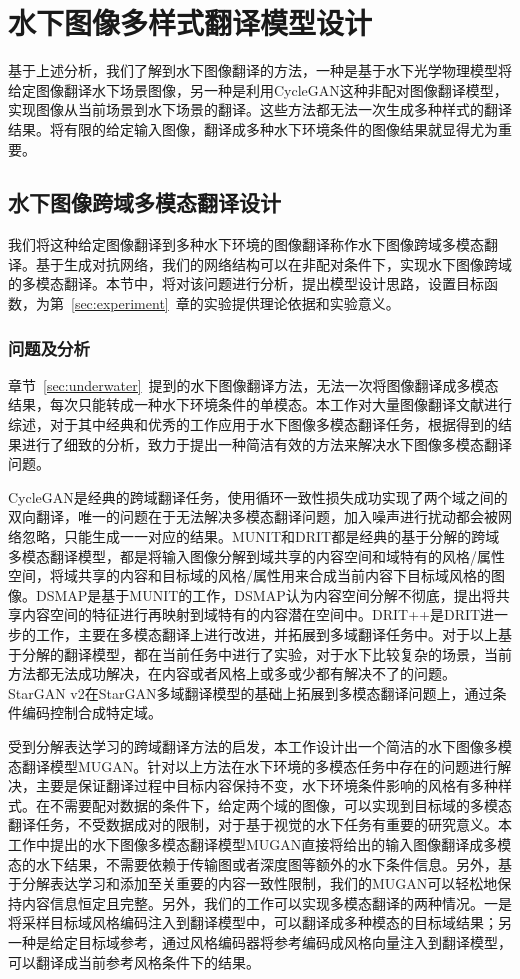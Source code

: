 \chapter{水下图像多样式翻译模型设计}
基于上述分析，我们了解到水下图像翻译的方法，一种是基于水下光学物理模型将给定图像翻译水下场景图像，另一种是利用CycleGAN这种非配对图像翻译模型，实现图像从当前场景到水下场景的翻译。这些方法都无法一次生成多种样式的翻译结果。将有限的给定输入图像，翻译成多种水下环境条件的图像结果就显得尤为重要。

\section{水下图像跨域多模态翻译设计}
我们将这种给定图像翻译到多种水下环境的图像翻译称作水下图像跨域多模态翻译。基于生成对抗网络，我们的网络结构可以在非配对条件下，实现水下图像跨域的多模态翻译。本节中，将对该问题进行分析，提出模型设计思路，设置目标函数，为第~\ref{sec:experiment}~章的实验提供理论依据和实验意义。

\subsection{问题及分析}
章节~\ref{sec:underwater}~提到的水下图像翻译方法，无法一次将图像翻译成多模态结果，每次只能转成一种水下环境条件的单模态。本工作对大量图像翻译文献进行综述，对于其中经典和优秀的工作应用于水下图像多模态翻译任务，根据得到的结果进行了细致的分析，致力于提出一种简洁有效的方法来解决水下图像多模态翻译问题。

CycleGAN是经典的跨域翻译任务，使用循环一致性损失成功实现了两个域之间的双向翻译，唯一的问题在于无法解决多模态翻译问题，加入噪声进行扰动都会被网络忽略，只能生成一一对应的结果。MUNIT和DRIT都是经典的基于分解的跨域多模态翻译模型，都是将输入图像分解到域共享的内容空间和域特有的风格/属性空间，将域共享的内容和目标域的风格/属性用来合成当前内容下目标域风格的图像。DSMAP是基于MUNIT的工作，DSMAP认为内容空间分解不彻底，提出将共享内容空间的特征进行再映射到域特有的内容潜在空间中。DRIT++是DRIT进一步的工作，主要在多模态翻译上进行改进，并拓展到多域翻译任务中。对于以上基于分解的翻译模型，都在当前任务中进行了实验，对于水下比较复杂的场景，当前方法都无法成功解决，在内容或者风格上或多或少都有解决不了的问题。StarGAN v2在StarGAN多域翻译模型的基础上拓展到多模态翻译问题上，通过条件编码控制合成特定域。

受到分解表达学习的跨域翻译方法的启发，本工作设计出一个简洁的水下图像多模态翻译模型MUGAN。针对以上方法在水下环境的多模态任务中存在的问题进行解决，主要是保证翻译过程中目标内容保持不变，水下环境条件影响的风格有多种样式。在不需要配对数据的条件下，给定两个域的图像，可以实现到目标域的多模态翻译任务，不受数据成对的限制，对于基于视觉的水下任务有重要的研究意义。本工作中提出的水下图像多模态翻译模型MUGAN直接将给出的输入图像翻译成多模态的水下结果，不需要依赖于传输图或者深度图等额外的水下条件信息。另外，基于分解表达学习和添加至关重要的内容一致性限制，我们的MUGAN可以轻松地保持内容信息恒定且完整。另外，我们的工作可以实现多模态翻译的两种情况。一是将采样目标域风格编码注入到翻译模型中，可以翻译成多种模态的目标域结果；另一种是给定目标域参考，通过风格编码器将参考编码成风格向量注入到翻译模型，可以翻译成当前参考风格条件下的结果。

